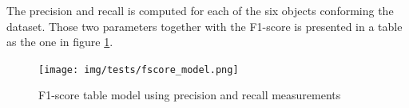 		The precision and recall is computed for each of the six objects conforming the dataset. 
		Those two parameters together with the F1-score is presented in a table as the one in figure \ref{fscore_model}. 

		\begin{figure}[H]
				\begin{center}
			    \texttt{[image: img/tests/fscore\_model.png]}
				\caption[F1-score table model]{F1-score table model using precision and recall measurements}
				\label{fscore_model}

				\end{center}
		\end{figure}








